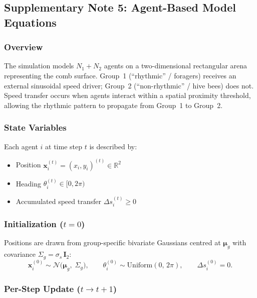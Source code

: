 \documentclass{article}
\newcommand{\vect}[1]{\mathbf{#1}}
\newcommand{\added}[1]{{\color{blue}#1}}
\newcommand{\added}[1]{#1}
\begin{document}
\clearpage

\subsection{\added{Supplementary Note 5: Agent-Based Model Equations}}

\added{
\subsubsection*{Overview}

The simulation models $N_1 + N_2$ agents on a two-dimensional rectangular arena
representing the comb surface.  Group~1 (``rhythmic'' / foragers) receives an
external sinusoidal speed driver; Group~2 (``non-rhythmic'' / hive bees) does
not.  Speed transfer occurs when agents interact within a spatial proximity
threshold, allowing the rhythmic pattern to propagate from Group~1 to Group~2.

\subsubsection*{State Variables}

Each agent $i$ at time step $t$ is described by:
\begin{itemize}
  \item Position $\vect{x}_i^{(t)} = (x_i, y_i)^{(t)} \in \mathbb{R}^2$
  \item Heading $\theta_i^{(t)} \in [0, 2\pi)$
  \item Accumulated speed transfer $\Delta s_i^{(t)} \geq 0$
\end{itemize}

\subsubsection*{Initialization ($t = 0$)}

Positions are drawn from group-specific bivariate Gaussians centred at
$\vect{\mu}_g$ with covariance $\Sigma_g = \sigma_s \, \vect{I}_2$:
%
\begin{equation}
  \vect{x}_i^{(0)} \sim \mathcal{N}\!\bigl(\vect{\mu}_g,\; \Sigma_g\bigr),
  \qquad
  \theta_i^{(0)} \sim \mathrm{Uniform}(0,\, 2\pi),
  \qquad
  \Delta s_i^{(0)} = 0.
\end{equation}

\subsubsection*{Per-Step Update ($t \to t+1$)}

}
\end{document}
